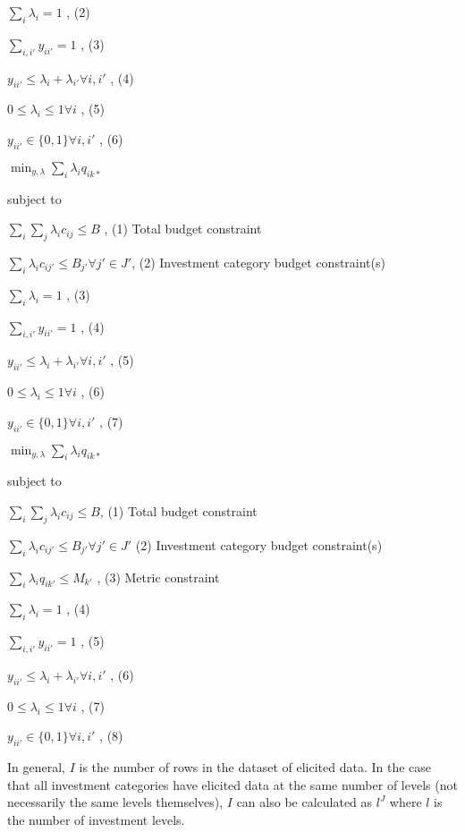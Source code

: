 \documentclass[letterpaper,10pt,english]{sphinxmanual}
\begin{document}
\(\sum_i \lambda_i = 1\) , (2)

\(\sum_{i,i'} y_{ii'} = 1\) , (3)

\(y_{ii'} \leq \lambda_i + \lambda_{i'} \forall i, i'\) , (4)

\(0 \leq \lambda_i \leq 1 \forall i\) , (5)

\(y_{ii'} \in \{ 0, 1 \} \forall i, i'\) , (6)


\(\min_{y, \lambda} \sum_i \lambda_{i}q_{ik*}\)

subject to

\(\sum_i \sum_j \lambda_{i}c_{ij} \leq B\) , (1) Total budget constraint

\(\sum_i \lambda_{i}c_{ij'} \leq B_{j'} \forall j' \in J'\),   (2) Investment category budget constraint(s)

\(\sum_i \lambda_i = 1\) , (3)

\(\sum_{i,i'} y_{ii'} = 1\) , (4)

\(y_{ii'} \leq \lambda_i + \lambda_{i'} \forall i, i'\) , (5)

\(0 \leq \lambda_i \leq 1 \forall i\) , (6)

\(y_{ii'} \in \{ 0, 1 \} \forall i, i'\) , (7)


\(\min_{y, \lambda} \sum_i \lambda_{i}q_{ik*}\)

subject to

\(\sum_i \sum_j \lambda_{i}c_{ij} \leq B\), (1) Total budget constraint

\(\sum_i \lambda_{i}c_{ij'} \leq B_{j'} \forall j' \in J'\)   (2) Investment category budget constraint(s)

\(\sum_i \lambda_{i}q_{ik'} \leq M_{k'}\) , (3) Metric constraint

\(\sum_i \lambda_i = 1\) , (4)

\(\sum_{i,i'} y_{ii'} = 1\) , (5)

\(y_{ii'} \leq \lambda_i + \lambda_{i'} \forall i, i'\) , (6)

\(0 \leq \lambda_i \leq 1 \forall i\) , (7)

\(y_{ii'} \in \{ 0, 1 \} \forall i, i'\) , (8)


In general, \(I\) is the number of rows in the dataset of elicited data. In the case that all investment categories have elicited data at the same number of levels (not necessarily the same levels themselves), \(I\) can also be calculated as \(l^J\) where \(l\) is the number of investment levels.
\end{document}
